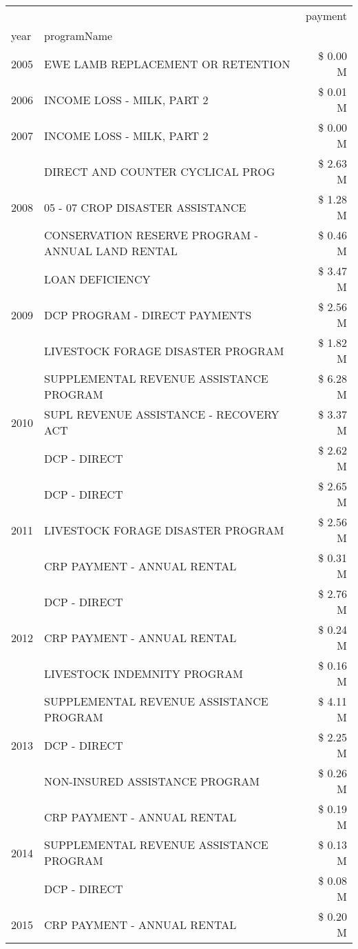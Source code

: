 \begin{tabular}{llr}
\toprule
 &  & payment \\
year & programName &  \\
\midrule
2005 & EWE LAMB REPLACEMENT OR RETENTION & \$ 0.00 M \\
\cline{1-3}
2006 & INCOME LOSS - MILK, PART 2 & \$ 0.01 M \\
\cline{1-3}
2007 & INCOME LOSS - MILK, PART 2 & \$ 0.00 M \\
\cline{1-3}
\multirow[t]{3}{*}{2008} & DIRECT AND COUNTER CYCLICAL PROG & \$ 2.63 M \\
 & 05 - 07 CROP DISASTER ASSISTANCE & \$ 1.28 M \\
 & CONSERVATION RESERVE PROGRAM - ANNUAL LAND RENTAL & \$ 0.46 M \\
\cline{1-3}
\multirow[t]{3}{*}{2009} & LOAN DEFICIENCY & \$ 3.47 M \\
 & DCP PROGRAM - DIRECT PAYMENTS & \$ 2.56 M \\
 & LIVESTOCK FORAGE DISASTER  PROGRAM & \$ 1.82 M \\
\cline{1-3}
\multirow[t]{3}{*}{2010} & SUPPLEMENTAL REVENUE ASSISTANCE PROGRAM & \$ 6.28 M \\
 & SUPL REVENUE ASSISTANCE - RECOVERY ACT & \$ 3.37 M \\
 & DCP - DIRECT & \$ 2.62 M \\
\cline{1-3}
\multirow[t]{3}{*}{2011} & DCP - DIRECT & \$ 2.65 M \\
 & LIVESTOCK FORAGE DISASTER PROGRAM & \$ 2.56 M \\
 & CRP PAYMENT - ANNUAL RENTAL & \$ 0.31 M \\
\cline{1-3}
\multirow[t]{3}{*}{2012} & DCP - DIRECT & \$ 2.76 M \\
 & CRP PAYMENT - ANNUAL RENTAL & \$ 0.24 M \\
 & LIVESTOCK INDEMNITY PROGRAM & \$ 0.16 M \\
\cline{1-3}
\multirow[t]{3}{*}{2013} & SUPPLEMENTAL REVENUE ASSISTANCE PROGRAM & \$ 4.11 M \\
 & DCP - DIRECT & \$ 2.25 M \\
 & NON-INSURED ASSISTANCE PROGRAM & \$ 0.26 M \\
\cline{1-3}
\multirow[t]{3}{*}{2014} & CRP PAYMENT - ANNUAL RENTAL & \$ 0.19 M \\
 & SUPPLEMENTAL REVENUE ASSISTANCE PROGRAM & \$ 0.13 M \\
 & DCP - DIRECT & \$ 0.08 M \\
\cline{1-3}
\multirow[t]{3}{*}{2015} & CRP PAYMENT - ANNUAL RENTAL & \$ 0.20 M \\

\end{tabular}
